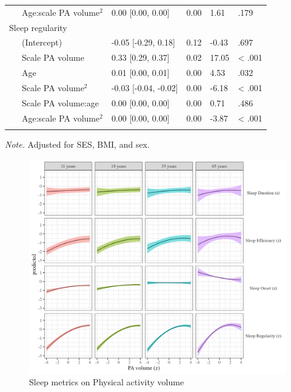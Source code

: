 \documentclass[
  man]{apa6}
\begin{document}
\begin{table}[tbp]
\begin{center}
\begin{threeparttable}
\begin{tabular}{lllll}
\ \ \ Age:scale PA volume$^2$ & 0.00 [0.00, 0.00] & 0.00 & 1.61 & .179\\
Sleep regularity &  &  &  & \\
\ \ \ (Intercept) & -0.05 [-0.29, 0.18] & 0.12 & -0.43 & .697\\
\ \ \ Scale PA volume & 0.33 [0.29, 0.37] & 0.02 & 17.05 & < .001\\
\ \ \ Age & 0.01 [0.00, 0.01] & 0.00 & 4.53 & .032\\
\ \ \ Scale PA volume$^2$ & -0.03 [-0.04, -0.02] & 0.00 & -6.18 & < .001\\
\ \ \ Scale PA volume:age & 0.00 [0.00, 0.00] & 0.00 & 0.71 & .486\\
\ \ \ Age:scale PA volume$^2$ & 0.00 [0.00, 0.00] & 0.00 & -3.87 & < .001\\
\bottomrule
\addlinespace
\end{tabular}

\begin{tablenotes}[para]
\normalsize{\textit{Note.} Adjusted for SES, BMI, and sex. }
\end{tablenotes}

\end{threeparttable}
\end{center}

\end{table}

\begin{figure}
\includegraphics[width=1.1\linewidth]{../Figures/sleep on pa_volume} \caption{Sleep metrics on Physical activity volume}\label{fig:sleep-by-volume-fig}
\end{figure}
\end{document}
